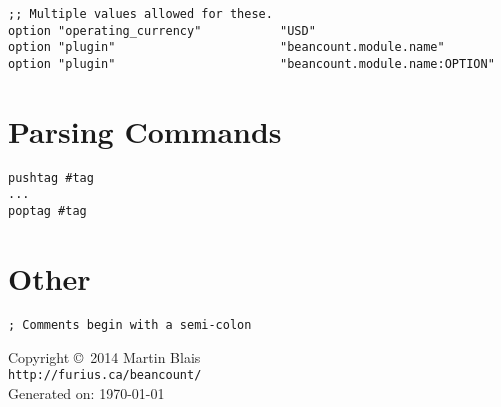 \documentclass[10pt,landscape]{article}
\begin{document}
\begin{multicols}{2}
\begin{verbatim}
;; Multiple values allowed for these.
option "operating_currency"           "USD"
option "plugin"                       "beancount.module.name"
option "plugin"                       "beancount.module.name:OPTION"
\end{verbatim}



\section{Parsing Commands}
\begin{verbatim}
pushtag #tag
...
poptag #tag
\end{verbatim}



\section{Other}
\begin{verbatim}
; Comments begin with a semi-colon
\end{verbatim}



\scriptsize
\begin{center}
  Copyright \copyright\ 2014 Martin Blais \\
  \texttt{http://furius.ca/beancount/} \\
  Generated on: \today
\end{center}
\end{multicols}
\end{document}
